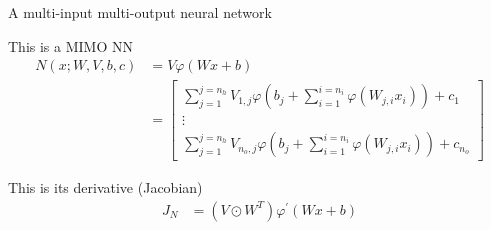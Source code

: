 \documentclass[dvipsnames,handout]{beamer}
\renewcommand{\v}{\varphi}
\newcommand{\vp}{\v^\prime}
\begin{document}
\begin{frame}{A multi-input multi-output neural network}
	\begin{block}{This is a MIMO NN}
		\begin{align*}
	N(x;W,V,b,c)&=V\v(Wx+b)\\
	&=\left[\begin{array}{c}
{\displaystyle \sum_{j=1}^{j=n_{h}}}V_{1,j}\v\left(b_{j}+\sum_{i=1}^{i=n_{i}}\v\left(W_{j,i}x_{i}\right)\right) + c_1\\
\vdots\\
{\displaystyle \sum_{j=1}^{j=n_{h}}}V_{n_{o},j}\v\left(b_{j}+\sum_{i=1}^{i=n_{i}}\v\left(W_{j,i}x_{i}\right)\right) +c_{n_o}
\end{array}\right] \label{multiNNWNN}
		\end{align*}
	\end{block}
	
	\pause
	
	\begin{block}{This is its derivative (Jacobian)}
		\begin{align*}
		J_N&=\left(V\odot W^{T}\right)\vp(Wx+b)
		\end{align*}
	\end{block}
\end{frame}
\end{document}
